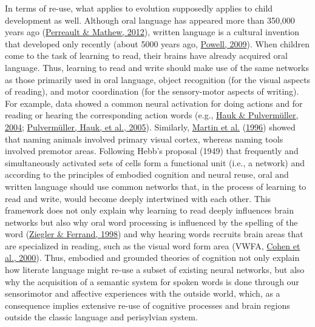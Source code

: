 \documentclass[
  a4paper,12pt,twoside,onecolumn,openright,final,oldfontcommands]{memoir}
\begin{document}
In terms of re-use, what applies to evolution supposedly applies to child development as well. Although oral language has appeared more than 350,000 years ago (\protect\hyperlink{ref-perreault_dating_2012}{Perreault \& Mathew, 2012}), written language is a cultural invention that developed only recently (about 5000 years ago, \protect\hyperlink{ref-powell_writing_2009}{Powell, 2009}). When children come to the task of learning to read, their brains have already acquired oral language. Thus, learning to read and write should make use of the same networks as those primarily used in oral language, object recognition (for the visual aspects of reading), and motor coordination (for the sensory-motor aspects of writing). For example, data showed a common neural activation for doing actions and for reading or hearing the corresponding action words (e.g., \protect\hyperlink{ref-hauk_neurophysiological_2004}{Hauk \& Pulvermüller, 2004}; \protect\hyperlink{ref-pulvermuller_functional_2005}{Pulvermüller, Hauk, et al., 2005}). Similarly, \protect\hyperlink{ref-martin_neural_1996}{Martin et al.} (\protect\hyperlink{ref-martin_neural_1996}{1996}) showed that naming animals involved primary visual cortex, whereas naming tools involved premotor areas. Following Hebb's proposal (1949) that frequently and simultaneously activated sets of cells form a functional unit (i.e., a network) and according to the principles of embodied cognition and neural reuse, oral and written language should use common networks that, in the process of learning to read and write, would become deeply intertwined with each other. This framework does not only explain why learning to read deeply influences brain networks but also why oral word processing is influenced by the spelling of the word (\protect\hyperlink{ref-ziegler_orthography_1998}{Ziegler \& Ferrand, 1998}) and why hearing words recruits brain areas that are specialized in reading, such as the visual word form area (VWFA, \protect\hyperlink{ref-cohen_visual_2000}{Cohen et al., 2000}). Thus, embodied and grounded theories of cognition not only explain how literate language might re-use a subset of existing neural networks, but also why the acquisition of a semantic system for spoken words is done through our sensorimotor and affective experiences with the outside world, which, as a consequence implies extensive re-use of cognitive processes and brain regions outside the classic language and perisylvian system.
\end{document}

